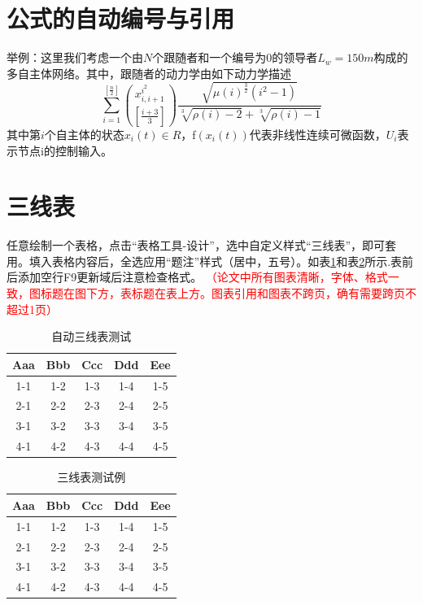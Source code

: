 \section{公式的自动编号与引用}
举例：这里我们考虑一个由$N$个跟随者和一个编号为0的领导者$L_w = 150 m$构成的多自主体网络。其中，跟随者的动力学由如下动力学描述
\begin{equation}
\sum_{i=1}^{\left[ \frac{n}{2}\right]} \binom{x_{i,i+1}^{i^2}}
{\left[\frac{i+3}{3} \right]} \frac{\sqrt{\mu(i)^{\frac{3}{2}}
(i^2-1)}} {\sqrt[3]{\rho(i)-2}+\sqrt[3]{\rho(i)-1}}
\end{equation}
其中第$i$个自主体的状态$x_i (t)\in R$，f$(x_i (t))$代表非线性连续可微函数，$U_i$表示节点i的控制输入。


\section{三线表}
任意绘制一个表格，点击“表格工具-设计”，选中自定义样式“三线表”，即可套用。填入表格内容后，全选应用“题注”样式（居中，五号）。如表\ref{Tab2-1}和表\ref{Tab2-2}所示.表前后添加空行F9更新域后注意检查格式。 
\textcolor{red}{（论文中所有图表清晰，字体、格式一致，图标题在图下方，表标题在表上方。图表引用和图表不跨页，确有需要跨页不超过1页）}

\begin{table}[htbp]
  \centering
  \caption{自动三线表测试}
    \begin{tabular}{ccccc}
    \toprule
    Aaa & Bbb & Ccc & Ddd & Eee \\
    \midrule
    1-1  & 1-2  & 1-3 & 1-4 & 1-5 \\
    2-1  & 2-2  & 2-3 & 2-4 & 2-5 \\
    3-1  & 3-2  & 3-3 & 3-4 & 3-5 \\
    4-1  & 4-2  & 4-3 & 4-4 & 4-5 \\
    \bottomrule
    \end{tabular}
  \label{Tab2-1}
\end{table}

\begin{table}[htbp]
  \centering
  \caption{三线表测试例}
    \begin{tabular}{ccccc}
    \toprule
    Aaa & Bbb & Ccc & Ddd & Eee \\
    \midrule
    1-1  & 1-2  & 1-3 & 1-4 & 1-5 \\
    2-1  & 2-2  & 2-3 & 2-4 & 2-5 \\
    3-1  & 3-2  & 3-3 & 3-4 & 3-5 \\
    4-1  & 4-2  & 4-3 & 4-4 & 4-5 \\
    \bottomrule
    \end{tabular}
  \label{Tab2-2}
\end{table}



